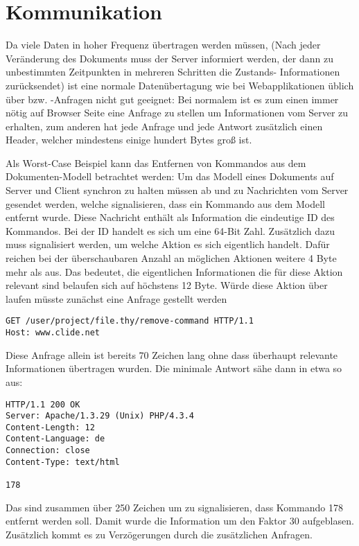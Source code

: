 \section{Kommunikation}
\label{sec:comm}

Da viele Daten in hoher Frequenz übertragen werden müssen, (Nach jeder Veränderung des Dokuments
muss der Server informiert werden, der dann zu unbestimmten Zeitpunkten in mehreren Schritten die
Zustands- Informationen zurücksendet) ist eine normale Datenübertagung wie bei Webapplikationen
üblich über  bzw. -Anfragen nicht gut geeignet: Bei normalem  ist es
zum einen immer nötig auf Browser Seite eine Anfrage zu stellen um Informationen vom Server zu
erhalten, zum anderen hat jede Anfrage und jede Antwort zusätzlich einen Header, welcher mindestens
einige hundert Bytes groß ist.

Als Worst-Case Beispiel kann das Entfernen von Kommandos aus dem Dokumenten-Modell betrachtet
werden: Um das Modell eines Dokuments auf Server und Client synchron zu halten müssen ab und zu
Nachrichten vom Server gesendet werden, welche signalisieren, dass ein Kommando aus dem Modell
entfernt wurde. Diese Nachricht enthält als Information die eindeutige ID des Kommandos. Bei der ID
handelt es sich um eine 64-Bit Zahl. Zusätzlich dazu muss signalisiert werden, um welche Aktion es
sich eigentlich handelt. Dafür reichen bei der überschaubaren Anzahl an möglichen Aktionen weitere 4
Byte mehr als aus. Das bedeutet, die eigentlichen Informationen die für diese Aktion relevant sind
belaufen sich auf höchstens 12 Byte. Würde diese Aktion über  laufen müsste zunächst eine
Anfrage gestellt werden

\begin{lstlisting}
GET /user/project/file.thy/remove-command HTTP/1.1
Host: www.clide.net
\end{lstlisting}

Diese Anfrage allein ist bereits 70 Zeichen lang ohne dass überhaupt relevante Informationen
übertragen wurden. Die minimale Antwort sähe dann in etwa so aus:

\begin{lstlisting}
HTTP/1.1 200 OK
Server: Apache/1.3.29 (Unix) PHP/4.3.4
Content-Length: 12
Content-Language: de
Connection: close
Content-Type: text/html

178
\end{lstlisting}

Das sind zusammen über 250 Zeichen um zu signalisieren, dass Kommando 178 entfernt werden soll.
Damit wurde die Information um den Faktor 30 aufgeblasen. Zusätzlich kommt es zu Verzögerungen durch
die zusätzlichen Anfragen. 

